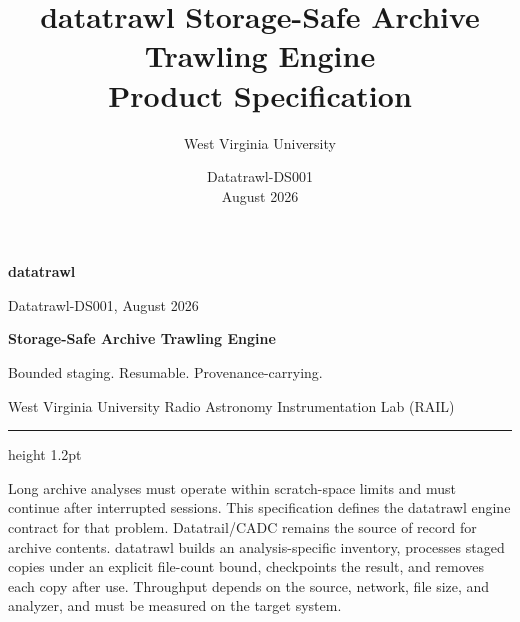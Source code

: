 \documentclass[10pt,letterpaper]{article}
\title{datatrawl Storage-Safe Archive Trawling Engine\\Product Specification}
\author{West Virginia University}
\date{Datatrawl-DS001 \\ August 2026}
\begin{document}
\thispagestyle{fancy}
{\sffamily
\begin{minipage}[t]{0.39\textwidth}
  {\fontsize{24}{26}\selectfont\bfseries\color{TrawlAmber}datatrawl}\par
  {\small Datatrawl-DS001, August 2026}
\end{minipage}%
\begin{minipage}[t]{0.61\textwidth}
  \raggedleft
  {\large\bfseries Storage-Safe Archive Trawling Engine}\par
  {\small Bounded staging. Resumable. Provenance-carrying.}\par
  {\small West Virginia University Radio Astronomy Instrumentation Lab (RAIL)}
\end{minipage}
}
\vspace{6pt}
{\color{TrawlAmber}\hrule height 1.2pt}
\vspace{8pt}

{\small\color{TrawlGray}Long archive analyses must operate within scratch-space
limits and must continue after interrupted sessions. This specification defines
the datatrawl engine contract for that problem. Datatrail/CADC remains
the source of record for archive contents. datatrawl builds an
analysis-specific inventory, processes staged copies under an explicit
file-count bound, checkpoints the result, and removes each copy after use.
Throughput depends on the source, network, file size, and analyzer, and must be
measured on the target system.}
\end{document}
